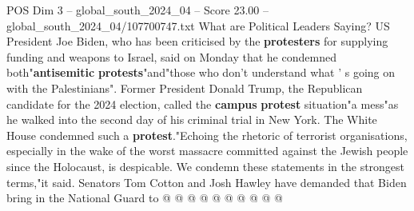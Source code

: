 \begin{textsample}{POS Dim 3 – global\_south\_2024\_04 – Score 23.00 – global\_south\_2024\_04/107700747.txt}
What are Political Leaders Saying?
US President Joe Biden, who has been criticised by the \textbf{protesters} for supplying funding and weapons to Israel, said on Monday that he condemned both"\textbf{antisemitic} \textbf{protests}"and"those who don't understand what ' s going on with the Palestinians".
Former President Donald Trump, the Republican candidate for the 2024 election, called the \textbf{campus} \textbf{protest} situation"a mess"as he walked into the second day of his criminal trial in New York.
The White House condemned such a \textbf{protest}."Echoing the rhetoric of terrorist organisations, especially in the wake of the worst massacre committed against the Jewish people since the Holocaust, is despicable.
We condemn these statements in the strongest terms,"it said.
Senators Tom Cotton and Josh Hawley have demanded that Biden bring in the National Guard to @ @ @ @ @ @ @ @ @ @

\end{textsample}
